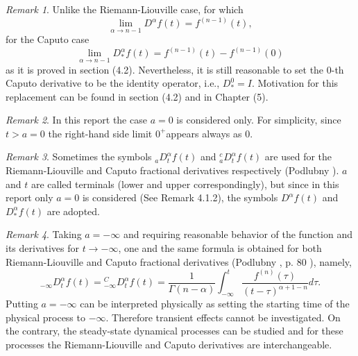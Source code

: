 \documentclass[a4paper,14pt,oneside]{book}
\theoremstyle{plain}
\theoremstyle{definition}
\theoremstyle{remark}
\newtheorem{rmk}{Remark}[section]
\begin{document}
\begin{center}
\begin{flushleft}
{\begin{rmk}
Unlike the Riemann-Liouville case, for which 
$$ \lim_{\alpha \rightarrow n-1} D^{\alpha} f(t)=f^{(n-1)}(t), $$ 
for the Caputo case 
$$ \lim_{\alpha \rightarrow n-1} D_{*}^{\alpha} f(t)=f^{(n-1)}(t)-f^{(n-1)}(0) $$ 
as it is proved in section (4.2). Nevertheless, it is still reasonable to set the 0-th Caputo derivative to be the identity operator, i.e., $D_{*}^{0}=I$. Motivation for this replacement can be found in section (4.2) and in Chapter (5).
\end{rmk}
\begin{rmk}
In this report the case $a=0$ is considered only. For simplicity, since $t>a=0$ the right-hand side limit $0^{+}$appears always as 0.
\end{rmk}
\begin{rmk}
Sometimes the symbols ${ }_{a} D_{t}^{\alpha} f(t)$ and ${ }_{a}^{c} D_{t}^{\alpha} f(t)$ are used for the Riemann-Liouville and Caputo fractional derivatives respectively (Podlubny \cite{bb22}). $a$ and $t$ are called terminals (lower and upper correspondingly), but since in this report only $a=0$ is considered (See Remark 4.1.2), the symbols $D^{\alpha} f(t)$ and $D_{*}^{\alpha} f(t)$ are adopted.
\end{rmk}
\begin{rmk}
Taking $a=-\infty$ and requiring reasonable behavior of the function and its derivatives for $t \rightarrow-\infty$, one and the same formula is obtained for both Riemann-Liouville and Caputo fractional derivatives (Podlubny \cite{bb22}, p. 80 ), namely,
\begin{equation*}
{ }_{-\infty} D_{t}^{\alpha} f(t)= { }_{-\infty}^{C}D_{t}^{\alpha} f(t)=\frac{1}{\Gamma(n-\alpha)} \int_{-\infty}^{t} \frac{f^{(n)}(\tau)}{(t-\tau)^{\alpha+1-n}} d \tau .
\end{equation*}
Putting $a=-\infty$ can be interpreted physically as setting the starting time of the physical process to $-\infty$. Therefore transient effects cannot be investigated. On the contrary, the steady-state dynamical processes can be studied and for these processes the Riemann-Liouville and Caputo derivatives are interchangeable.
\end{rmk}
}
\end{flushleft}
        \end{center}
       
\end{document}
